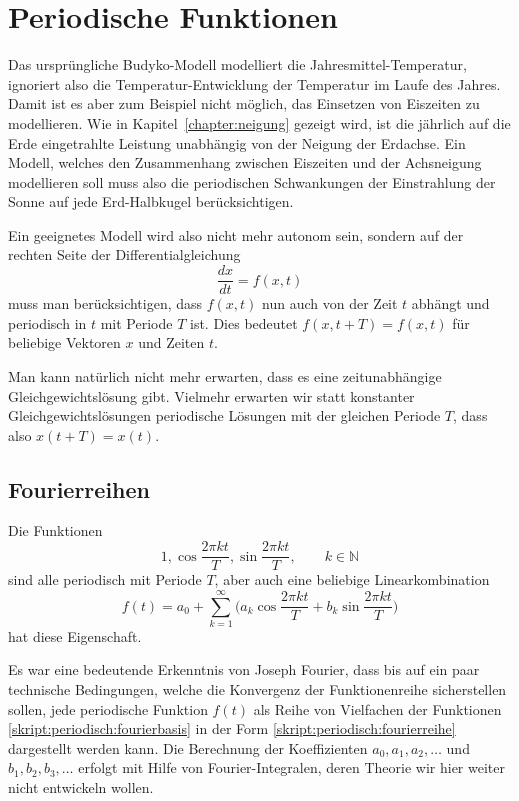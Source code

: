 %
%
%
\section{Periodische Funktionen}
Das ursprüngliche Budyko-Modell modelliert die Jahresmittel-Temperatur,
ignoriert also die Temperatur-Entwicklung der Temperatur im Laufe des
Jahres.
Damit ist es aber zum Beispiel nicht möglich, das Einsetzen von
Eiszeiten zu modellieren.
Wie in Kapitel~\ref{chapter:neigung} gezeigt wird, ist die jährlich
auf die Erde eingetrahlte Leistung unabhängig von der Neigung der
Erdachse.
Ein Modell, welches den Zusammenhang zwischen Eiszeiten und der
Achsneigung modellieren soll muss also die periodischen Schwankungen
der Einstrahlung der Sonne auf jede Erd-Halbkugel berücksichtigen.

Ein geeignetes Modell wird also nicht mehr autonom sein, sondern auf der
rechten Seite der Differentialgleichung
\[
\frac{dx}{dt} = f(x,t)
\]
muss man berücksichtigen, dass $f(x,t)$ nun auch von der Zeit $t$ abhängt
und periodisch in $t$ mit Periode $T$ ist.
Dies bedeutet $f(x,t+T)=f(x,t)$ für beliebige Vektoren $x$ und 
Zeiten $t$.

Man kann natürlich nicht mehr erwarten, dass es eine zeitunabhängige
Gleichgewichtslösung gibt.
Vielmehr erwarten wir statt konstanter Gleichgewichtslösungen 
periodische Lösungen mit der gleichen Periode $T$, dass also
$x(t+T)=x(t)$.

\subsection{Fourierreihen}
Die Funktionen
\begin{equation}
1,
\cos \frac{2\pi kt}{T},
\sin \frac{2\pi kt}{T},\qquad k\in \mathbb N
\label{skript:periodisch:fourierbasis}
\end{equation}
sind alle periodisch mit Periode $T$, aber auch eine beliebige
Linearkombination
\begin{equation}
f(t)
=
a_0  +\sum_{k=1}^\infty\biggl(
a_k \cos \frac{2\pi kt}{T} + b_k\sin\frac{2\pi kt}{T}
\biggr)
\label{skript:periodisch:fourierreihe}
\end{equation}
hat diese Eigenschaft.

Es war eine bedeutende Erkenntnis von Joseph Fourier, dass bis auf ein
paar technische Bedingungen, welche die Konvergenz der Funktionenreihe
sicherstellen sollen, jede periodische Funktion $f(t)$ 
als Reihe von Vielfachen der Funktionen
\eqref{skript:periodisch:fourierbasis}
in der Form
\eqref{skript:periodisch:fourierreihe}
dargestellt werden kann.
Die Berechnung der Koeffizienten $a_0,a_1,a_2,\dots$ und $b_1,b_2,b_3,\dots$
erfolgt mit Hilfe von Fourier-Integralen, deren Theorie wir hier weiter
nicht entwickeln wollen.

